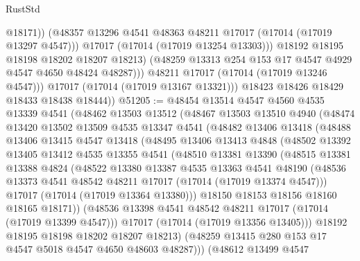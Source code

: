 \begin{lexlean}{RustStd}
\begin{coremodule}
{\begin{coremodule}
{{{{{{{{{{{{{{{{{{{{{{{{{{{{{{{{{{{{{{{{{{{{{{{{{{{{{{{                        @18171))
                    (@48357 @13296 @4541 @48363 @48211 @17017 (@17014 (@17019 @13297 @4547)))
                    @17017
                    (@17014 (@17019 @13254 @13303)))
                  @18192
                  @18195
                  @18198
                  @18202
                  @18207
                  @18213)
                (@48259 @13313 @254 @153 @17 @4547 @4929 @4547 @4650 @48424 @48287)))
            @48211
            @17017
            (@17014 (@17019 @13246 @4547)))
          @17017
          (@17014 (@17019 @13167 @13321)))
        @18423
        @18426
        @18429
        @18433
        @18438
        @18444))
@51205 := @48454
    @13514
    @4547
    @4560
    @4535
    @13339
    @4541
    (@48462
      @13503
      @13512
      (@48467
        @13503
        @13510
        @4940
        (@48474
          @13420
          @13502
          @13509
          @4535
          @13347
          @4541
          (@48482
            @13406
            @13418
            (@48488
              @13406
              @13415
              @4547
              @13418
              (@48495
                @13406
                @13413
                @4848
                (@48502
                  @13392
                  @13405
                  @13412
                  @4535
                  @13355
                  @4541
                  (@48510
                    @13381
                    @13390
                    (@48515
                      @13381
                      @13388
                      @4824
                      (@48522
                        @13380
                        @13387
                        @4535
                        @13363
                        @4541
                        @48190
                        (@48536 @13373 @4541 @48542 @48211 @17017 (@17014 (@17019 @13374 @4547)))
                        @17017
                        (@17014 (@17019 @13364 @13380)))
                      @18150
                      @18153
                      @18156
                      @18160
                      @18165
                      @18171))
                  (@48536 @13398 @4541 @48542 @48211 @17017 (@17014 (@17019 @13399 @4547)))
                  @17017
                  (@17014 (@17019 @13356 @13405)))
                @18192
                @18195
                @18198
                @18202
                @18207
                @18213)
              (@48259 @13415 @280 @153 @17 @4547 @5018 @4547 @4650 @48603 @48287)))
          (@48612
            @13499
            @4547
}}}}}}}}}}}}}}}}}}}}}}}}}}}}}}}}}}}}}}}}}}}}}}}}}}}}}}}
\end{coremodule}}
\end{coremodule}
\end{lexlean}
